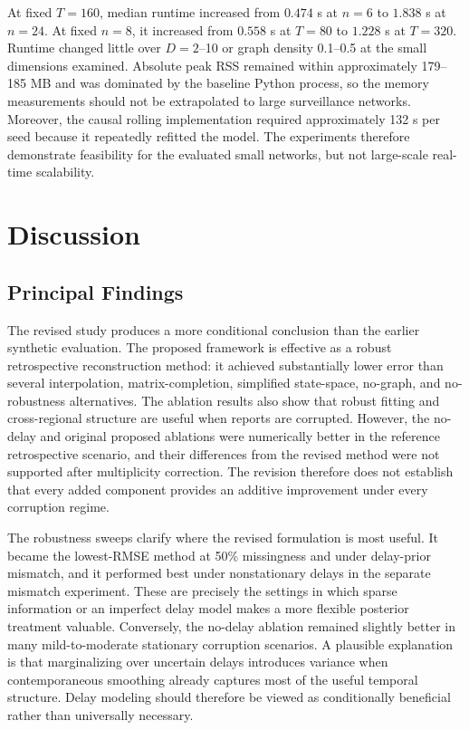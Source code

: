 At fixed $T=160$, median runtime increased from $0.474$ s at $n=6$ to $1.838$ s at $n=24$. At fixed $n=8$, it increased from $0.558$ s at $T=80$ to $1.228$ s at $T=320$. Runtime changed little over $D=2$--10 or graph density 0.1--0.5 at the small dimensions examined. Absolute peak RSS remained within approximately 179--185 MB and was dominated by the baseline Python process, so the memory measurements should not be extrapolated to large surveillance networks. Moreover, the causal rolling implementation required approximately 132 s per seed because it repeatedly refitted the model. The experiments therefore demonstrate feasibility for the evaluated small networks, but not large-scale real-time scalability.

\section{Discussion}
\label{sec:discussion}

\subsection{Principal Findings}
\label{subsec:principal_findings}

The revised study produces a more conditional conclusion than the earlier synthetic evaluation. The proposed framework is effective as a robust retrospective reconstruction method: it achieved substantially lower error than several interpolation, matrix-completion, simplified state-space, no-graph, and no-robustness alternatives. The ablation results also show that robust fitting and cross-regional structure are useful when reports are corrupted. However, the no-delay and original proposed ablations were numerically better in the reference retrospective scenario, and their differences from the revised method were not supported after multiplicity correction. The revision therefore does not establish that every added component provides an additive improvement under every corruption regime.

The robustness sweeps clarify where the revised formulation is most useful. It became the lowest-RMSE method at 50\% missingness and under delay-prior mismatch, and it performed best under nonstationary delays in the separate mismatch experiment. These are precisely the settings in which sparse information or an imperfect delay model makes a more flexible posterior treatment valuable. Conversely, the no-delay ablation remained slightly better in many mild-to-moderate stationary corruption scenarios. A plausible explanation is that marginalizing over uncertain delays introduces variance when contemporaneous smoothing already captures most of the useful temporal structure. Delay modeling should therefore be viewed as conditionally beneficial rather than universally necessary.

